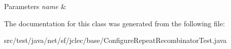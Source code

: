 \begin{DoxyParams}{Parameters}
{\em name} & \\
\hline
\end{DoxyParams}


The documentation for this class was generated from the following file\-:\begin{DoxyCompactItemize}
\item 
src/test/java/net/sf/jclec/base/Configure\-Repeat\-Recombinator\-Test.\-java\end{DoxyCompactItemize}
